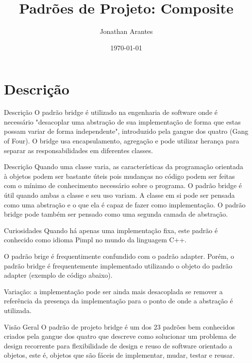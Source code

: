 \documentclass{beamer}
\title{Padrões de Projeto: Composite}
\date{\today}
\author{Jonathan Arantes}
\institute{Instituto Federal de Minas Gerais - Campus Formiga}
\begin{document}
  \lstset{basicstyle=\tiny,style=JavaStyle}
  \maketitle
  \section{Descrição}
  \begin{frame}{Descrição}
O padrão bridge é utilizado na engenharia de software onde é necessário "desacoplar uma abstração de sua implementação de forma que estas possam variar de forma independente", introduzido pela gangue dos quatro (Gang of Four). O bridge usa encapsulamento, agregação e pode utilizar herança para separar as responsabilidades em diferentes classes.
  \end{frame}

  \begin{frame}{Descrição}
Quando uma classe varia, as características da programação orientada à objetos podem ser bastante úteis pois mudanças no código podem ser feitas com o mínimo de conhecimento necessário sobre o programa. O padrão bridge é útil quando ambas a classe e seu uso variam. A classe em si pode ser pensada como uma abstração e o que ela é capaz de fazer como implementação. O padrão bridge pode também ser pensado como uma segunda camada de abstração.
  \end{frame}

  \begin{frame}{Curiosidades}
Quando há apenas uma implementação fixa, este padrão é conhecido como idioma Pimpl no mundo da linguagem C++.

O padrão brige é frequentimente confundido com o padrão adapter. Porém, o padrão bridge é frequentemente implementado utilizando o objeto do padrão adapter (exemplo de código abaixo).

Variação: a implementação pode ser ainda mais desacoplada se remover a referência da presença da implementação para o ponto de onde a abstração é utilizada.
  \end{frame}

  \begin{frame}{Visão Geral}
O padrão de projeto bridge é um dos 23 padrões bem conhecidos criados pela gangue dos quatro que descreve como solucionar um problema de design recorrente para flexibilidade de design e reuso de software orientado a objetos, este é, objetos que são fáceis de implementar, mudar, testar e reusar.
  \end{frame}
\end{document}
